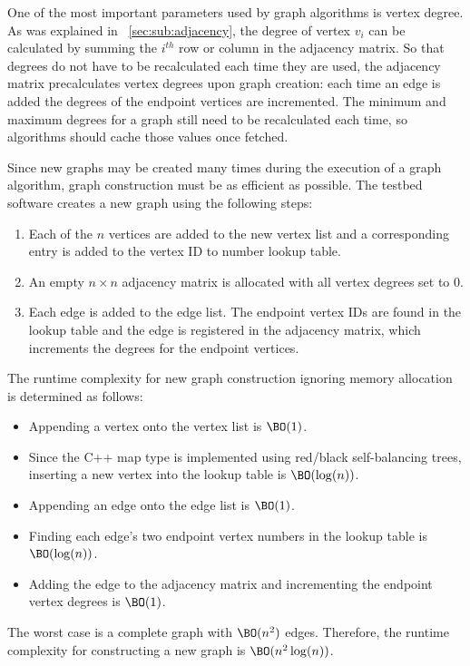 One of the most important parameters used by graph algorithms is vertex degree.  As was explained in
\sectionname~\ref{sec:sub:adjacency}, the degree of vertex \(v_i\) can be calculated by summing the \(i^{th}\) row
or column in the adjacency matrix.  So that degrees do not have to be recalculated each time they are used, the
adjacency matrix precalculates vertex degrees upon graph creation: each time an edge is added the degrees of the
endpoint vertices are incremented.  The minimum and maximum degrees for a graph still need to be recalculated each
time, so algorithms should cache those values once fetched.

Since new graphs may be created many times during the execution of a graph algorithm, graph construction must be
as efficient as possible.  The testbed software creates a new graph using the following steps:
\begin{enumerate}
\item Each of the \(n\) vertices are added to the new vertex list and a corresponding entry is added to the vertex
  ID to number lookup table.
\item An empty \(n\times n\) adjacency matrix is allocated with all vertex degrees set to \(0\).
\item Each edge is added to the edge list.  The endpoint vertex IDs are found in the lookup table and the edge is
  registered in the adjacency matrix, which increments the degrees for the endpoint vertices.
\end{enumerate}

The runtime complexity for new graph construction ignoring memory allocation is determined as follows:
\begin{itemize}
\item Appending a vertex onto the vertex list is \(\BO(1)\).
\item Since the C++ map type is implemented using red/black self-balancing trees, inserting a new vertex into the
  lookup table is \(\BO(\log(n))\).
\item Appending an edge onto the edge list is \(\BO(1)\).
\item Finding each edge's two endpoint vertex numbers in the lookup table is \(\BO(\log(n))\).
\item Adding the edge to the adjacency matrix and incrementing the endpoint vertex degrees is \(\BO(1)\).
\end{itemize}

The worst case is a complete graph with \(\BO(n^2)\) edges.  Therefore, the runtime complexity for
constructing a new graph is \(\BO(n^2\log(n))\).

